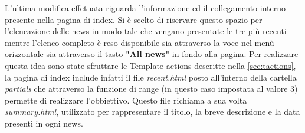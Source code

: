 \documentclass[target=bach,aauheader=]{thud}
\begin{document}
\newline
L'ultima modifica effetuata riguarda l'informazione ed il collegamento interno presente nella pagina di index. Si è scelto di riservare questo spazio per l'elencazione delle news in modo tale che vengano presentate le tre più recenti
mentre l'elenco completo è reso disponibile sia attraverso la voce nel menù orizzontale sia attraverso il tasto \textbf{"All news"} in fondo alla pagina. 
Per realizzare questa idea sono state sfruttare le Template actions descritte nella \cref{sec:tactions}, la pagina di index include infatti il file \textit{recent.html} posto all'interno della cartella \textit{partials} che attraverso la funzione di range (in questo caso impostata al valore 3) permette di realizzare l'obbiettivo. 
Questo file richiama a sua volta \textit{summary.html}, utilizzato per rappresentare il titolo, la breve descrizione e la data presenti in ogni news. 
\end{document}
